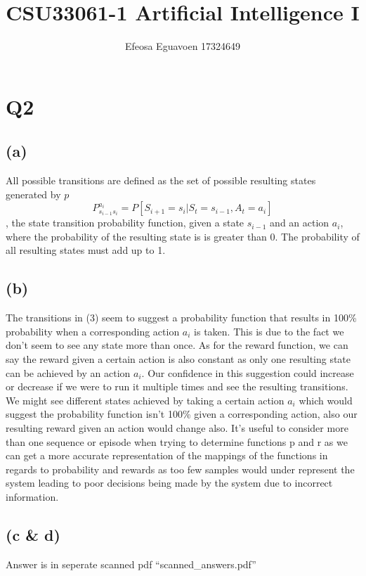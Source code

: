 \documentclass[11pt]{article} %
\title{CSU33061-1 Artificial Intelligence I }
\author{Efeosa Eguavoen 17324649}
\begin{document}
\maketitle

\section{Q2}
\subsection{(a)}
All possible transitions are defined as the set of possible resulting states generated by \(p\)
 \[P_{s_{i-1}s_i}^{a_i} = P[S_{i+1} = s_i| S_t = s_{i-1}, A_t = a_i] \], the state transition probability function,  given a state \(s_{i-1}\) and an action \(a_i\), where the probability of the resulting state is is greater than 0. The probability of all resulting states must add up to 1.

\subsection{(b)}
The transitions in (3) seem to suggest a probability function that results in 100\% probability when a corresponding action \(a_i\) is taken. This is due to the fact we don't seem to see any state more than once. As for the reward function, we can say the reward given a certain action is also constant as only one resulting state can be achieved by an action \(a_i\).
\newline Our confidence in this suggestion could increase or decrease if we were to run it multiple times and see the resulting transitions. We might see different states achieved by taking a certain action \(a_i\) which would suggest the probability function isn't 100\% given a corresponding action, also our resulting reward given an action would change also.
\newline
It's useful to consider more than one sequence or episode when trying to determine functions p and r as we can get a more accurate representation of the mappings of the functions in regards to probability and rewards as too few samples would under represent the system leading to poor decisions being made by the system due to incorrect information.
\subsection{(c \& d)}
Answer is in seperate scanned pdf  ``scanned\_answers.pdf''
\end{document}
